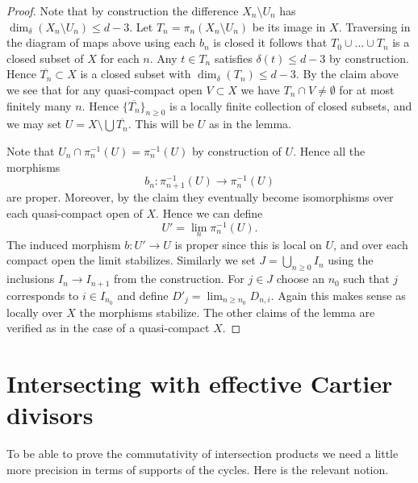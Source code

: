 \begin{proof}
\medskip\noindent
Note that by construction the difference $X_n \setminus U_n$
has $\dim_\delta(X_n \setminus U_n) \leq d - 3$.
Let $T_n = \pi_n(X_n \setminus U_n)$ be its image in $X$.
Traversing in the diagram of maps above using each $b_n$ is closed
it follows that $T_0 \cup \ldots \cup T_n$ is a closed subset of $X$
for each $n$. Any $t \in T_n$ satisfies $\delta(t) \leq d - 3$
by construction. Hence $\overline{T_n} \subset X$ is a closed subset
with $\dim_\delta(T_n) \leq d - 3$. By the claim above we see
that for any quasi-compact open $V \subset X$ we have
$T_n \cap V \not = \emptyset$ for at most finitely many $n$.
Hence $\{\overline{T_n}\}_{n \geq 0}$ is a locally finite
collection of closed subsets, and we may set
$U = X \setminus \bigcup \overline{T_n}$. This will be
$U$ as in the lemma.

\medskip\noindent
Note that $U_n \cap \pi_n^{-1}(U) = \pi_n^{-1}(U)$ by construction
of $U$. Hence all the morphisms
$$
b_n : \pi_{n + 1}^{-1}(U) \longrightarrow \pi_n^{-1}(U)
$$
are proper. Moreover, by the claim they eventually become isomorphisms
over each quasi-compact open of $X$. Hence we can define
$$
U' = \lim_n \pi_n^{-1}(U).
$$
The induced morphism $b : U' \to U$ is proper since this is local
on $U$, and over each compact open the limit stabilizes. Similarly
we set $J = \bigcup_{n \geq 0} I_n$ using the inclusions
$I_n \to I_{n + 1}$ from the construction. For $j \in J$ choose
an $n_0$ such that $j$ corresponds to $i \in I_{n_0}$ and define
$D'_j = \lim_{n \geq n_0} D_{n, i}$. Again this makes sense
as locally over $X$ the morphisms stabilize.
The other claims of the lemma are verified as in the case
of a quasi-compact $X$.
\end{proof}







\section{Intersecting with effective Cartier divisors}
\label{section-intersecting-effective-Cartier}

\noindent
To be able to prove the commutativity of intersection
products we need a little more precision in terms of
supports of the cycles. Here is the relevant notion.

